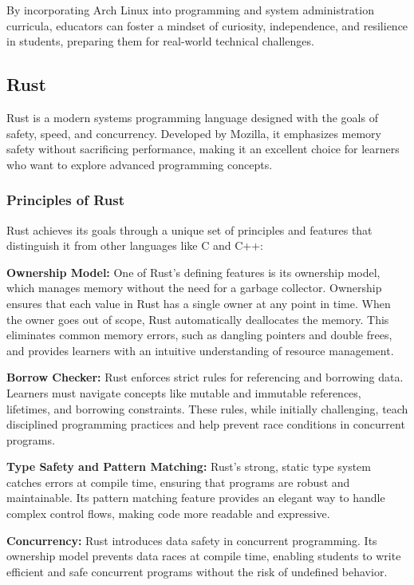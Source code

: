 \documentclass[12pt]{article}
\begin{document}
By incorporating Arch Linux into programming and system administration curricula, educators can foster a mindset of curiosity, independence, and resilience in students, preparing them for real-world technical challenges.


\subsection{Rust}
Rust is a modern systems programming language designed with the goals of safety, speed, and concurrency. Developed by Mozilla, it emphasizes memory safety without sacrificing performance, making it an excellent choice for learners who want to explore advanced programming concepts.

\subsubsection{Principles of Rust}
Rust achieves its goals through a unique set of principles and features that distinguish it from other languages like C and C++:

\textbf{Ownership Model:} One of Rust's defining features is its ownership model, which manages memory without the need for a garbage collector. Ownership ensures that each value in Rust has a single owner at any point in time. When the owner goes out of scope, Rust automatically deallocates the memory. This eliminates common memory errors, such as dangling pointers and double frees, and provides learners with an intuitive understanding of resource management.

\textbf{Borrow Checker:} Rust enforces strict rules for referencing and borrowing data. Learners must navigate concepts like mutable and immutable references, lifetimes, and borrowing constraints. These rules, while initially challenging, teach disciplined programming practices and help prevent race conditions in concurrent programs.

\textbf{Type Safety and Pattern Matching:} Rust's strong, static type system catches errors at compile time, ensuring that programs are robust and maintainable. Its pattern matching feature provides an elegant way to handle complex control flows, making code more readable and expressive.

\textbf{Concurrency:} Rust introduces data safety in concurrent programming. Its ownership model prevents data races at compile time, enabling students to write efficient and safe concurrent programs without the risk of undefined behavior.
\end{document}
